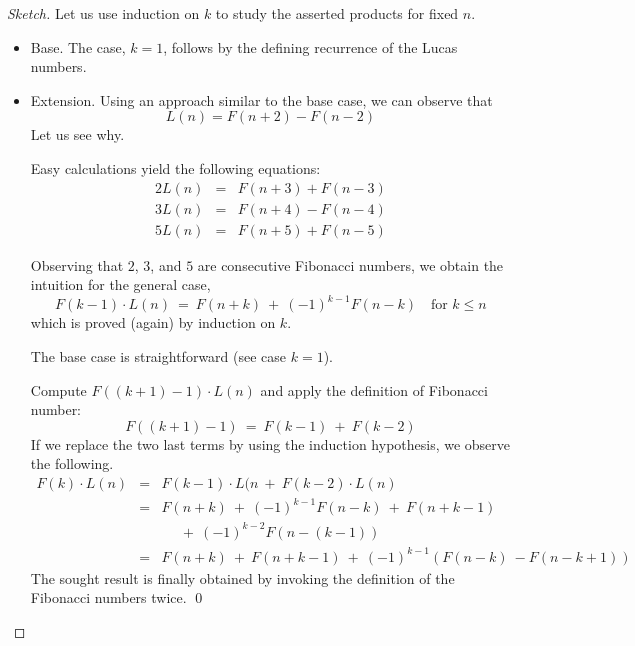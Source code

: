 \begin{proof}[Sketch]
Let us use induction on $k$ to study the asserted products for fixed $n$.
\begin{itemize}
\item
{\sf Base.} 
The case, $k=1$, follows by the defining recurrence of the Lucas numbers.

\item
{\sf Extension.}
Using an approach similar to the base case, we can observe that
\[ L(n) = F(n+2)-F(n-2) \] 
Let us see why.

\smallskip

Easy calculations yield the following equations:
\begin{eqnarray*}
2 L(n) & = & F(n+3) + F(n-3) \\
3 L(n) & = & F(n+4) - F(n-4) \\
5 L(n) & = & F(n+5) + F(n-5)
\end{eqnarray*}
 
Observing that $2$, $3$, and $5$ are consecutive Fibonacci numbers, we obtain the intuition for the general case,
\[  F(k-1) \cdot L(n) \ = \ F(n+k) \ + \ (-1)^{k-1}F(n-k) \ \ \ \mbox{ for  } k \leq n \]
which is proved (again) by induction on $k$.

\smallskip

The base case is straightforward (see case $k=1$).

\smallskip

Compute $F((k+1)-1) \cdot L(n)$ and apply the definition of Fibonacci number:
\[ F((k+1)-1) \ = \ F(k-1) \ + \ F(k-2) \]
If we replace the two last terms by using the induction hypothesis, we observe the following.
\begin{eqnarray*}
F(k) \cdot L(n) & = & F(k-1) \cdot L(n \ + \ F(k-2) \cdot L(n) \\
                        & = & F(n+k) \ + \ (-1)^{k-1} F(n-k) \ + \ F(n+k-1) \\
                        &    & \ \ \ \ \ \ + \ (-1)^{k-2} F(n-(k-1)) \\
                        & = & F(n+k) \ + \ F(n+k-1) \ + \ (-1)^{k-1} (F(n-k) \ -  F(n-k+1))
\end{eqnarray*}
The sought result is finally obtained by invoking the definition of the Fibonacci numbers twice. \qed
\end{itemize}
\end{proof}
